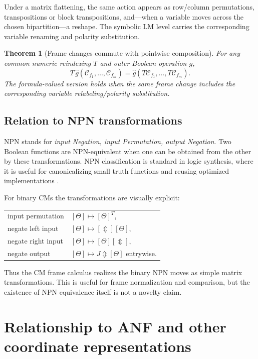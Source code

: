 \documentclass[11pt]{article}
\newtheorem{theorem}{Theorem}[section]
\theoremstyle{definition}
\theoremstyle{remark}
\newcommand{\cC}{\mathcal C}
\newcommand{\xor}{\mathbin{\Updownarrow}}
\begin{document}
Under a matrix flattening, the same action appears as row/column permutations, transpositions or block transpositions, and---when a variable moves across the chosen bipartition---a reshape.  The symbolic LM level carries the corresponding variable renaming and polarity substitution.

\begin{theorem}[Frame changes commute with pointwise composition]
For any common numeric reindexing $T$ and outer Boolean operation $g$,
\begin{equation}
 T\,\widehat g(\cC_{f_1},\ldots,\cC_{f_m})
 =\widehat g(T\cC_{f_1},\ldots,T\cC_{f_m}).
 \label{eq:framecommutes}
\end{equation}
The formula-valued version holds when the same frame change includes the corresponding variable relabeling/polarity substitution.
\end{theorem}

\subsection{Relation to NPN transformations}

NPN stands for \emph{input Negation, input Permutation, output Negation}.  Two Boolean functions are NPN-equivalent when one can be obtained from the other by these transformations.  NPN classification is standard in logic synthesis, where it is useful for canonicalizing small truth functions and reusing optimized implementations \cite{Mishchenko2006,Zhou2019}.

For binary CMs the transformations are visually explicit:
\begin{center}
\begin{tabular}{ll}
input permutation & $[\Theta]\mapsto[\Theta]^T$,\\
negate left input & $[\Theta]\mapsto[\Updownarrow][\Theta]$,\\
negate right input & $[\Theta]\mapsto[\Theta][\Updownarrow]$,\\
negate output & $[\Theta]\mapsto J\xor[\Theta]$ entrywise.
\end{tabular}
\end{center}
Thus the CM frame calculus realizes the binary NPN moves as simple matrix transformations.  This is useful for frame normalization and comparison, but the existence of NPN equivalence itself is not a novelty claim.

\section{Relationship to ANF and other coordinate representations}
\label{sec:anf}
\end{document}
